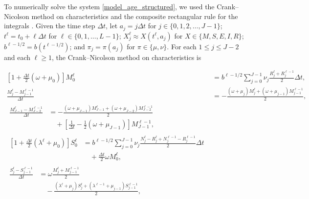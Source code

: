 \documentclass{jpmarticle}
\let\subequationsorig\subequations%
\let\endsubequationsorig\endsubequations%
\renewenvironment{subequations}{
  \subequationsorig
  \renewcommand{\theequation}{\theparentequation.\arabic{equation}}
}{
  \endsubequationsorig
}
\begin{document}
To numerically solve the system \eqref{model_age_structured}, we used
the Crank--Nicolson method on characteristics and the composite
rectangular rule for the integrals \autocite{milner_1992}.  Given the
time step $\Delta t$, let
$a_j = j \Delta t$ for $j \in \{0, 1, 2, \ldots, J - 1\}$;
$t^{\ell} = t_0 + \ell \Delta t$ for $\ell \in \{0, 1, \ldots, L - 1\}$;
$X_j^{\ell} \approx X(t^{\ell}, a_j)$ for $X \in \{M, S, E, I, R\}$;
$b^{\ell - 1 / 2} = b(t^{\ell - 1 / 2})$; and
$\pi_j = \pi(a_j)$ for $\pi \in \{\mu, \nu\}$.
For each $1 \leq j \leq J - 2$ and each $\ell \geq 1$, the
Crank--Nicolson method on characteristics is
\begin{subequations}
  \begin{align}
    \left[1 + \frac{\Delta t}{2} (\omega + \mu_0)\right]
    M_0^{\ell}
    &= b^{\ell - 1 / 2}
    \sum_{j = 0}^{J - 1} \nu_j \frac{R_j^{\ell} + R_j^{\ell - 1}}{2}
    \Delta t,
    \\
    \frac{M_j^{\ell} - M_{j - 1}^{\ell - 1}}{\Delta t} &=
    - \frac{(\omega + \mu_j) M_j^{\ell}
      + (\omega + \mu_{j - 1}) M_{j - 1}^{\ell - 1}}{2},
    \\
    \begin{split}
      \frac{M_{J - 1}^{\ell} - M_{J - 2}^{\ell - 1}}{\Delta t} &=
      - \frac{(\omega + \mu_{J - 1}) M_{J - 1}^{\ell}
        + (\omega + \mu_{J - 2}) M_{J - 2}^{\ell - 1}}{2}
      \\ & \quad {}
      + \left[
        \frac{1}{\Delta t} - \frac{1}{2} (\omega + \mu_{J - 1})
      \right] M_{J - 1}^{\ell - 1},
    \end{split}
    \\
    \begin{split}
      \left[1 + \frac{\Delta t}{2} (\lambda^{\ell} + \mu_0)\right] S_0^{\ell}
      &= b^{\ell - 1 / 2}
      \sum_{j = 0}^{J - 1}
      \nu_j
      \frac{N_j^{\ell} - R_j^{\ell} + N_j^{\ell - 1} - R_j^{\ell - 1}}{2}
      \Delta t
      \\ & \quad {}
      + \frac{\Delta t}{2} \omega M_0^{\ell},
    \end{split}
    \\
    \begin{split}
      \frac{S_j^{\ell} - S_{j - 1}^{\ell - 1}}{\Delta t} &=
      \omega \frac{M_j^{\ell} + M_{j - 1}^{\ell - 1}}{2}
      \\ & \quad {}
      - \frac{(\lambda^{\ell} + \mu_j) S_j^{\ell}
        + (\lambda^{\ell - 1} + \mu_{j - 1}) S_{j - 1}^{\ell - 1}}{2},
    \end{split}
    \\

\end{align}
\end{subequations}
\end{document}
